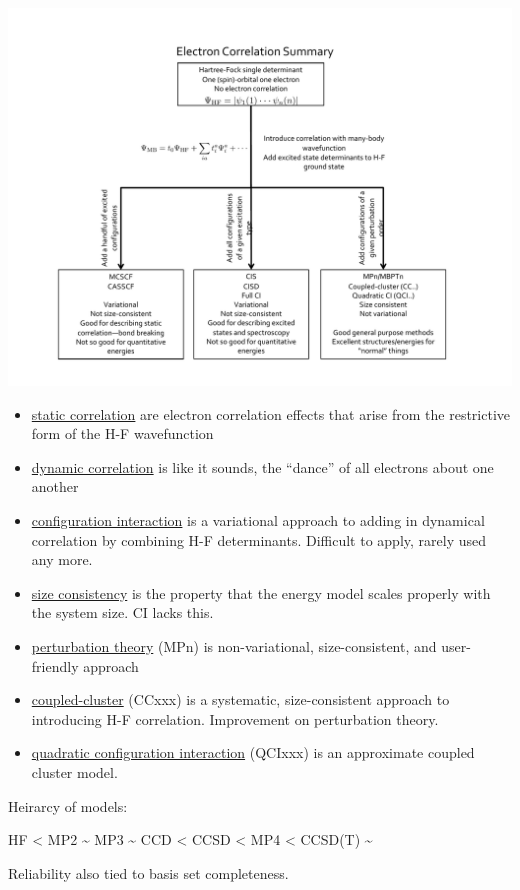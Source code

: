 \documentclass[11pt]{article}
\begin{document}
\begin{center}
\includegraphics[width=1.0\textwidth]{./Images/correlation-summary.pdf}
\end{center}

\begin{itemize}
\item \uline{static correlation} are electron correlation effects that arise from the restrictive form of the H-F wavefunction
\item \uline{dynamic correlation} is like it sounds, the ``dance'' of all electrons about one another
\item \uline{configuration interaction} is a variational approach to adding in dynamical correlation by combining H-F determinants. Difficult to apply, rarely used any more.
\item \uline{size consistency} is the property that the energy model scales properly with the system size.  CI lacks this.
\item \uline{perturbation theory} (MPn) is non-variational, size-consistent, and user-friendly approach
\item \uline{coupled-cluster} (CCxxx) is a systematic, size-consistent approach to introducing H-F correlation.  Improvement on perturbation theory.
\item \uline{quadratic configuration interaction} (QCIxxx) is an approximate coupled cluster model.
\end{itemize}

Heirarcy of models:
\begin{center}
HF < MP2 \textasciitilde{} MP3 \textasciitilde{} CCD < CCSD < MP4 < CCSD(T) \textasciitilde{}
\end{center}
Reliability also tied to basis set completeness.
\end{document}
